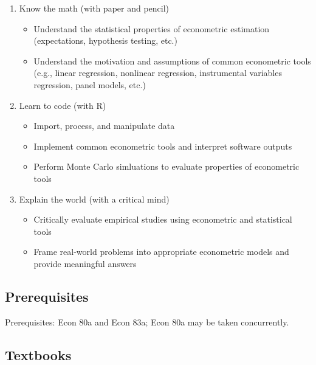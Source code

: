 \documentclass[
]{article}
\providecommand{\tightlist}{%
  \setlength{\itemsep}{0pt}\setlength{\parskip}{0pt}}
\begin{document}
\begin{enumerate}
\def\labelenumi{\arabic{enumi}.}
\tightlist
\item
  Know the math (with paper and pencil)

  \begin{itemize}
  \tightlist
  \item
    Understand the statistical properties of econometric estimation
    (expectations, hypothesis testing, etc.)
  \item
    Understand the motivation and assumptions of common econometric
    tools (e.g., linear regression, nonlinear regression, instrumental
    variables regression, panel models, etc.)
  \end{itemize}
\item
  Learn to code (with R)

  \begin{itemize}
  \tightlist
  \item
    Import, process, and manipulate data
  \item
    Implement common econometric tools and interpret software outputs
  \item
    Perform Monte Carlo simluations to evaluate properties of
    econometric tools
  \end{itemize}
\item
  Explain the world (with a critical mind)

  \begin{itemize}
  \tightlist
  \item
    Critically evaluate empirical studies using econometric and
    statistical tools
  \item
    Frame real-world problems into appropriate econometric models and
    provide meaningful answers
  \end{itemize}
\end{enumerate}

\hypertarget{prerequisites}{%
\subsection{Prerequisites}\label{prerequisites}}

Prerequisites: Econ 80a and Econ 83a; Econ 80a may be taken
concurrently.

\hypertarget{textbooks}{%
\subsection{Textbooks}\label{textbooks}}
\end{document}
